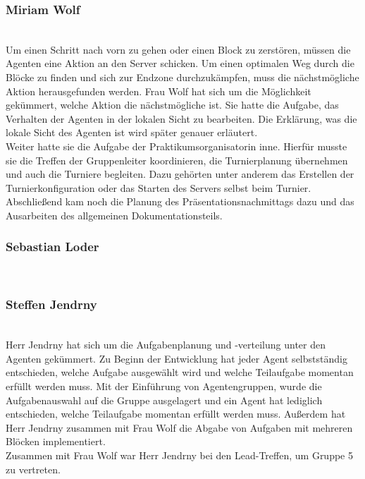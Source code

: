 \subsubsection{Miriam Wolf} ~\\
Um einen Schritt nach vorn zu gehen oder einen Block zu zerstören, müssen die Agenten eine Aktion an den Server schicken. Um einen optimalen Weg durch die Blöcke zu finden und sich zur Endzone durchzukämpfen, muss die nächstmögliche Aktion herausgefunden werden. Frau Wolf hat sich um die Möglichkeit gekümmert, welche Aktion die nächstmögliche ist. Sie hatte die Aufgabe, das Verhalten der Agenten in der lokalen Sicht zu bearbeiten. Die Erklärung, was die lokale Sicht des Agenten ist wird später genauer erläutert. \\

Weiter hatte sie die Aufgabe der Praktikumsorganisatorin inne. Hierfür musste sie die Treffen der Gruppenleiter koordinieren, die Turnierplanung übernehmen und auch die Turniere begleiten. Dazu gehörten unter anderem das Erstellen der Turnierkonfiguration oder das Starten des Servers selbst beim Turnier. Abschließend kam noch die Planung des Präsentationsnachmittags dazu und das Ausarbeiten des allgemeinen Dokumentationsteils.

\subsubsection{Sebastian Loder} ~\\
\subsubsection{Steffen Jendrny} ~\\
Herr Jendrny hat sich um die Aufgabenplanung und -verteilung unter den Agenten gekümmert. Zu Beginn der Entwicklung hat jeder Agent selbstständig entschieden, welche Aufgabe ausgewählt wird und welche Teilaufgabe momentan erfüllt werden muss. Mit der Einführung von Agentengruppen, wurde die Aufgabenauswahl auf die Gruppe ausgelagert und ein Agent hat lediglich entschieden, welche Teilaufgabe momentan erfüllt werden muss. Außerdem hat Herr Jendrny zusammen mit Frau Wolf die Abgabe von Aufgaben mit mehreren Blöcken implementiert. \\
Zusammen mit Frau Wolf war Herr Jendrny bei den Lead-Treffen, um Gruppe 5 zu vertreten.
